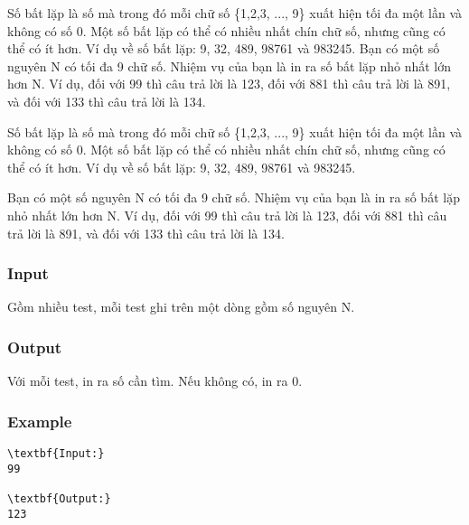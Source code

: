 



     Số bất lặp là số mà trong đó mỗi chữ số \{1,2,3, ..., 9\} xuất hiện tối đa một lần và không có số 0.       Một số bất lặp có thể có nhiều nhất chín chữ số, nhưng cũng có thể có ít hơn. Ví dụ về số bất lặp:       9, 32, 489, 98761 và 983245.       Bạn có một số nguyên N có tối đa 9 chữ số. Nhiệm vụ của bạn là in ra số bất lặp nhỏ nhất lớn       hơn N. Ví dụ, đối với 99 thì câu trả lời là 123, đối với 881 thì câu trả lời là 891, và đối với 133       thì câu trả lời là 134.    

   Số bất lặp là số mà trong đó mỗi chữ số \{1,2,3, ..., 9\} xuất hiện tối đa một lần và không có số 0. Một số bất lặp có thể có nhiều nhất chín chữ số, nhưng cũng có thể có ít hơn. Ví dụ về số bất lặp: 9, 32, 489, 98761 và 983245.  

   Bạn có một số nguyên N có tối đa 9 chữ số. Nhiệm vụ của bạn là in ra số bất lặp nhỏ nhất lớn hơn N. Ví dụ, đối với 99 thì câu trả lời là 123, đối với 881 thì câu trả lời là 891, và đối với 133 thì câu trả lời là 134.  



\subsubsection{   Input  }

   Gồm nhiều test, mỗi test ghi trên một dòng gồm số nguyên N.  

\subsubsection{   Output  }

   Với mỗi test, in ra số cần tìm. Nếu không có, in ra 0.  

\subsubsection{   Example  }
\begin{verbatim}
\textbf{Input:}
99

\textbf{Output:}
123
\end{verbatim}